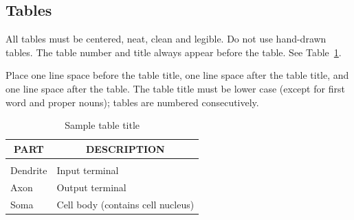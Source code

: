 \documentclass{article} %
\begin{document}
\subsection{Tables}

All tables must be centered, neat, clean and legible. Do not use hand-drawn
tables. The table number and title always appear before the table. See
Table~\ref{sample-table}.

Place one line space before the table title, one line space after the table
title, and one line space after the table. The table title must be lower case
(except for first word and proper nouns); tables are numbered consecutively.

\begin{table}[t]
\caption{Sample table title}
\label{sample-table}
\begin{center}
\begin{tabular}{ll}
\multicolumn{1}{c}{\bf PART}  &\multicolumn{1}{c}{\bf DESCRIPTION}
\\ \hline \\
Dendrite         &Input terminal \\
Axon             &Output terminal \\
Soma             &Cell body (contains cell nucleus) \\
\end{tabular}
\end{center}
\end{table}

\subsubsection*{}



\end{document}

